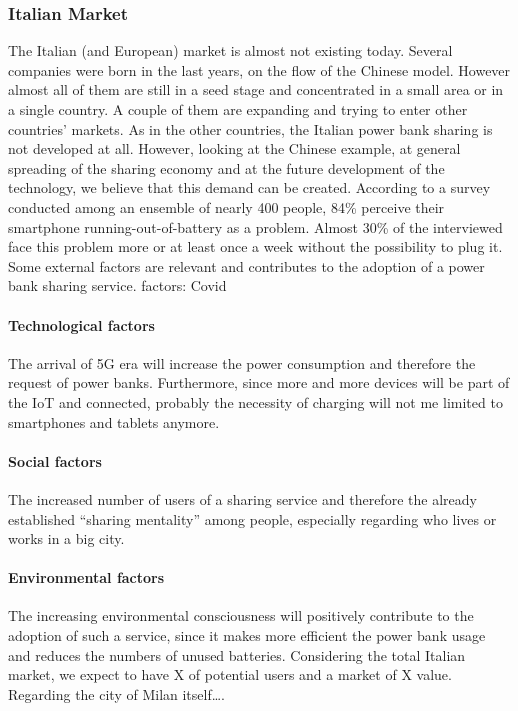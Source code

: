 \documentclass[12pt]{article}
\begin{document}
            \subsubsection{Italian Market}
                The Italian (and European) market is almost not existing today. 
                Several companies were born in the last years, on the flow of the Chinese model. 
                However almost all of them are still in a seed stage and concentrated in a small area or in a single country. 
                A couple of them are expanding and trying to enter other countries’ markets.
                As in the other countries, the Italian power bank sharing is not developed at all. 
                However, looking at the Chinese example, at general spreading of the sharing economy and at the future development of the technology,
                we believe that this demand can be created. According to a survey conducted among an ensemble of nearly 400 people, 84\% 
                perceive their smartphone running-out-of-battery as a problem. Almost 30\% of the interviewed face this problem more or at least
                once a week without the possibility to plug it. Some external factors are relevant and contributes to the adoption of a power bank sharing service. 
                \newline
                factors: Covid
            \paragraph*{Technological factors}
                The arrival of 5G era will increase the power consumption and therefore the request of power banks. 
                Furthermore, since more and more devices will be part of the IoT and connected, 
                probably the necessity of charging will not me limited to smartphones and tablets anymore. 

            \paragraph*{Social factors} 
                The increased number of users of a sharing service and therefore the already established “sharing mentality” among people, 
                especially regarding who lives or works in a big city.

            \paragraph*{Environmental factors} 
                The increasing environmental consciousness will positively contribute to the adoption of such a service, 
                since it makes more efficient the power bank usage and reduces the numbers of unused batteries. 
                Considering the total Italian market, we expect to have X of potential users and a market of X value. Regarding the city of Milan itself…. 
\end{document}
